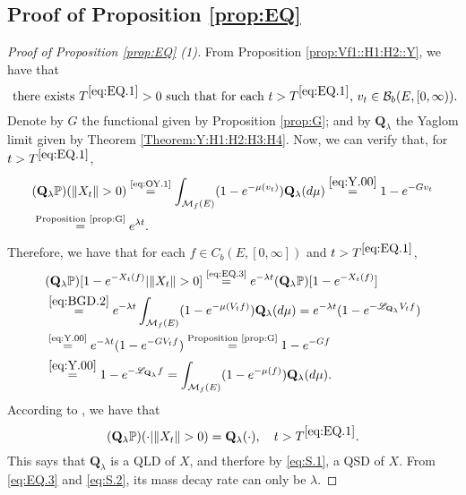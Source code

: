 \documentclass[12pt,a4paper]{amsart}
\numberwithin{equation}{section}
\theoremstyle{plain}
\theoremstyle{definition}
\theoremstyle{remark}
\begin{document}
\subsection{Proof of Proposition \ref{prop:EQ}} \label{sec:EQ}
\begin{proof}[Proof of Proposition \ref{prop:EQ} (1)]
	From Proposition \ref{prop:Vf1::H1:H2::Y}, we have that
	\begin{equation} \label{eq:EQ.1}
	\text{ there exists $T^{\eqref{eq:EQ.1}}>0$ such that for each $t>T^{\eqref{eq:EQ.1}}$, $v_t \in \mathcal B_b(E,[0,\infty))$.}
	\end{equation}	
	Denote by $G$ the functional given by Proposition \ref{prop:G}; and by $\mathbf Q_\lambda$ the Yaglom limit given by Theorem \ref{Theorem:Y:H1:H2:H3:H4}.
	Now, we can verify that,
	for $t> T^{\eqref{eq:EQ.1}}$,
	\begin{align}
	&(\mathbf Q_\lambda \mathbb P) (\|X_t\|>0)
	\overset{\text{\eqref{eq:OY.1}}}= \int_{\mathcal M_f(E)}(1-e^{-\mu(v_t)})\mathbf Q_\lambda (d\mu)
	\overset{\eqref{eq:Y.00}}= 1 - e^{-G v_t}
	\\&\overset{\text{Proposition \ref{prop:G}}}= e^{\lambda t}.  \label{eq:EQ.3}
	\end{align}
	Therefore, we have that for each $f\in C_b(E,[0,\infty])$ and $t > T^{\eqref{eq:EQ.1}}$,
	\begin{align}
	&(\mathbf Q_\lambda \mathbb P)[1 - e^{-X_t(f)} | \|X_t\| > 0]
	\overset{\text{\eqref{eq:EQ.3}}}= e^{- \lambda t} (\mathbf Q_\lambda \mathbb P)[1- e^{-X_t(f)}]
	\\& \overset{\eqref{eq:BGD.2}}= e^{- \lambda t} \int_{\mathcal M_f(E)} (1- e^{-\mu(V_tf)} ) \mathbf Q_\lambda (d\mu)
	= e^{-\lambda t} (1 - e^{- \mathscr L_{\mathbf Q_\lambda} V_tf})
	\\& \overset{\text{\eqref{eq:Y.00}}}= e^{-\lambda t} (1 - e^{- G V_tf})
	\overset{\text{Proposition \ref{prop:G}}}= 1 - e^{-Gf}
	\\&\overset{\eqref{eq:Y.00}}= 1- e^{-\mathscr L_{\mathbf Q_\lambda} f}
	=\int_{\mathcal M_f(E)} (1 - e^{-\mu(f)}) \mathbf Q_\lambda (d\mu).
	\end{align}
	According to \cite[Theorem 1.17]{Li2011MeasureValued}, we have that
	\[
	(\mathbf Q_\lambda \mathbb P)(\cdot |\|X_t\| > 0) = \mathbf Q_{\lambda}(\cdot), \quad t > T^{\eqref{eq:EQ.1}}.
	\]
	This says that $\mathbf Q_\lambda$ is a QLD of $X$, and therfore by \eqref{eq:S.1}, a QSD of $X$.
	From \eqref{eq:EQ.3} and \eqref{eq:S.2}, its mass decay rate can only be $\lambda$.
\end{proof}
\end{document}
